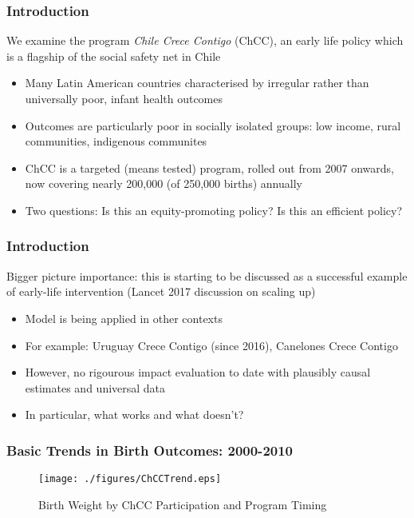 \documentclass[10pt,letterpaper,subeqn,table]{beamer}
\begin{document}
\begin{frame}
\frametitle{Introduction}
We examine the program \emph{Chile Crece Contigo} (ChCC), an early life policy which is
a flagship of the social safety net in Chile \vspace{3mm}
\begin{itemize}
\item Many Latin American countries characterised by irregular rather than universally poor,
  infant health outcomes
\item Outcomes are particularly poor in socially isolated groups: low income, rural
  communities, indigenous communites
\item ChCC is a targeted (means tested) program, rolled out from 2007 onwards, now
  covering nearly 200,000 (of 250,000 births) annually
\item Two questions: Is this an equity-promoting policy?  Is this an efficient policy?
\end{itemize}
\end{frame}

\begin{frame}
\frametitle{Introduction}
Bigger picture importance: this is starting to be discussed as a successful example of early-life intervention (Lancet 2017 discussion on scaling up) \vspace{3mm}
\begin{itemize}
\item Model is being applied in other contexts
\item For example: Uruguay Crece Contigo (since 2016), Canelones Crece Contigo
\item However, no rigourous impact evaluation to date with plausibly causal estimates and universal data
\item In particular, what works and what doesn't?
\end{itemize}
\end{frame}


\begin{frame}[label=Trends]
\frametitle{Basic Trends in Birth Outcomes: 2000-2010}
\begin{figure}[htpb!]
  \begin{center}
  \centering
  \caption{Birth Weight by ChCC Participation and Program Timing}
  \texttt{[image: ./figures/ChCCTrend.eps]}
  \label{fig:ChCCtrends}
\end{center}
\end{figure}
\vspace{-5mm}
\footnotesize{\hyperlink{longTrends}{}}
\end{frame}
\end{document}

